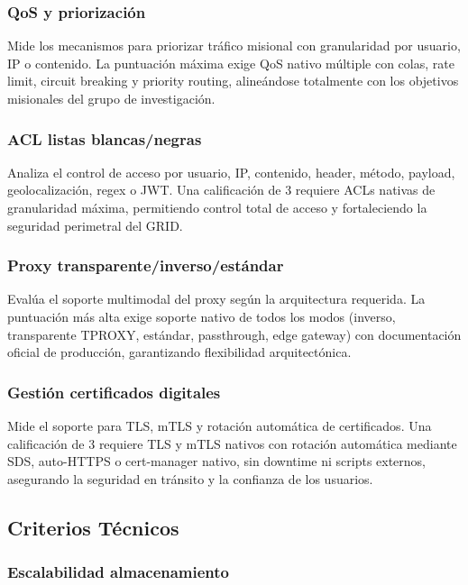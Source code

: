 \subsubsection{QoS y priorización}

Mide los mecanismos para priorizar tráfico misional con granularidad por usuario, IP o contenido. La puntuación máxima exige QoS nativo múltiple con colas, rate limit, circuit breaking y priority routing, alineándose totalmente con los objetivos misionales del grupo de investigación.

\subsubsection{ACL listas blancas/negras}

Analiza el control de acceso por usuario, IP, contenido, header, método, payload, geolocalización, regex o JWT. Una calificación de 3 requiere ACLs nativas de granularidad máxima, permitiendo control total de acceso y fortaleciendo la seguridad perimetral del GRID.

\subsubsection{Proxy transparente/inverso/estándar}

Evalúa el soporte multimodal del proxy según la arquitectura requerida. La puntuación más alta exige soporte nativo de todos los modos (inverso, transparente TPROXY, estándar, passthrough, edge gateway) con documentación oficial de producción, garantizando flexibilidad arquitectónica.

\subsubsection{Gestión certificados digitales}

Mide el soporte para TLS, mTLS y rotación automática de certificados. Una calificación de 3 requiere TLS y mTLS nativos con rotación automática mediante SDS, auto-HTTPS o cert-manager nativo, sin downtime ni scripts externos, asegurando la seguridad en tránsito y la confianza de los usuarios.

\subsection{Criterios Técnicos}

\subsubsection{Escalabilidad almacenamiento}

